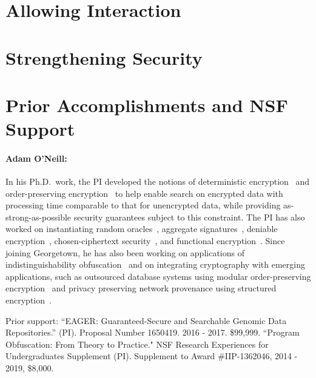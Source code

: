\documentclass[11pt]{article}
\theoremstyle{remark}
\begin{document}
%

\section{Allowing Interaction}
\label{sec:interactive}




\section{Strengthening Security}
\label{sec:improving security}


\section{Prior Accomplishments and NSF Support}

\paragraph{Adam O'Neill:}
In his Ph.D.~work, the PI  developed the notions of deterministic encryption~\cite{C:BelBolONe07,Amanatidis2007,C:BolFehONe08,C:BFOR08,TCC:FulNeiRey12} and order-preserving encryption~\cite{EC:BCLO09,C:BolCheONe11} to help enable search on encrypted data with processing time comparable to that for unencrypted data, while providing as-strong-as-possible security guarantees subject to this constraint.
The PI has also worked on  instantiating random oracles~\cite{C:KilOneSmi10,TCC:GoyONeRao11,EC:LewONeSmi13},   aggregate signatures~\cite{CCS:BGOY07,AC:GLOW12}, deniable encryption~\cite{C:OnePeiWat11},  chosen-ciphertext security~\cite{EC:KilMohOne10,PKC:DFMO14}, and  functional encryption~\cite{EPRINT:ONeill10b,C:DIJOPP13, CANS:BelONe13}.   %
Since joining Georgetown, he has also been working on  applications of indistinguishability obfuscation~\cite{PKC:DGLOZ16} and on integrating cryptography with emerging applications, such as outsourced database systems using modular order-preserving encryption~\cite{mavroforakis2015modular} and  privacy preserving network provenance using structured encryption~\cite{zhang2017privacy}.


Prior support: ``EAGER: Guaranteed-Secure and Searchable Genomic Data Repositories.'' (PI). Proposal Number 1650419.  2016 - 2017. \$99,999.
``Program Obfuscation: From Theory to Practice." NSF Research Experiences for Undergraduates Supplement (PI).
Supplement to Award \#IIP-1362046,   2014 - 2019, \$8,000.
\end{document}
